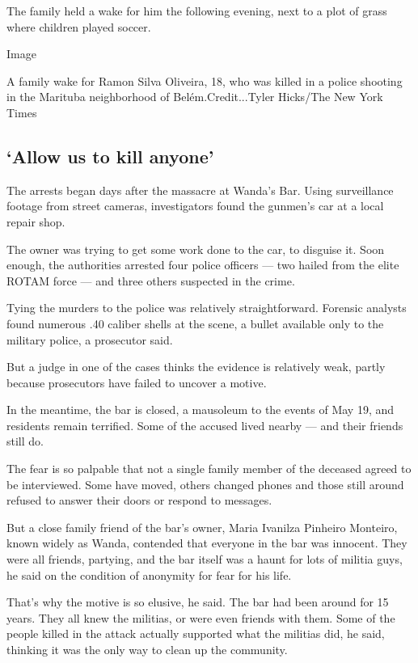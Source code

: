 The family held a wake for him the following evening, next to a plot of
grass where children played soccer.

Image

A family wake for Ramon Silva Oliveira, 18, who was killed in a police
shooting in the Marituba neighborhood of Belém.Credit...Tyler Hicks/The
New York Times

\hypertarget{allow-us-to-kill-anyone}{%
\subsection{`Allow us to kill anyone'}\label{allow-us-to-kill-anyone}}

The arrests began days after the massacre at Wanda's Bar. Using
surveillance footage from street cameras, investigators found the
gunmen's car at a local repair shop.

The owner was trying to get some work done to the car, to disguise it.
Soon enough, the authorities arrested four police officers --- two
hailed from the elite ROTAM force --- and three others suspected in the
crime.

Tying the murders to the police was relatively straightforward. Forensic
analysts found numerous .40 caliber shells at the scene, a bullet
available only to the military police, a prosecutor said.

But a judge in one of the cases thinks the evidence is relatively weak,
partly because prosecutors have failed to uncover a motive.

In the meantime, the bar is closed, a mausoleum to the events of May 19,
and residents remain terrified. Some of the accused lived nearby --- and
their friends still do.

The fear is so palpable that not a single family member of the deceased
agreed to be interviewed. Some have moved, others changed phones and
those still around refused to answer their doors or respond to messages.

But a close family friend of the bar's owner, Maria Ivanilza Pinheiro
Monteiro, known widely as Wanda, contended that everyone in the bar was
innocent. They were all friends, partying, and the bar itself was a
haunt for lots of militia guys, he said on the condition of anonymity
for fear for his life.

That's why the motive is so elusive, he said. The bar had been around
for 15 years. They all knew the militias, or were even friends with
them. Some of the people killed in the attack actually supported what
the militias did, he said, thinking it was the only way to clean up the
community.


